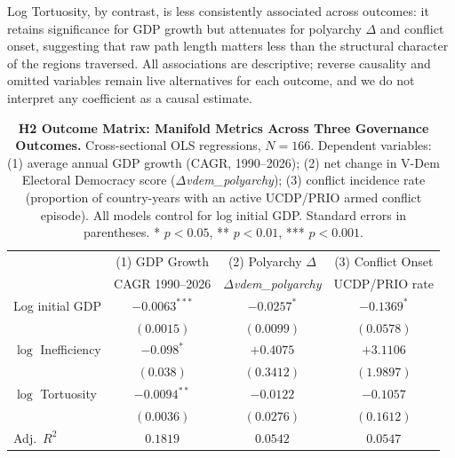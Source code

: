 \documentclass[12pt]{article}
\begin{document}
Log Tortuosity, by contrast, is less consistently associated across outcomes: it retains significance for GDP growth but attenuates for polyarchy $\Delta$ and conflict onset, suggesting that raw path length matters less than the structural character of the regions traversed. All associations are descriptive; reverse causality and omitted variables remain live alternatives for each outcome, and we do not interpret any coefficient as a causal estimate.

\begin{table}[htbp]
    \centering
    \caption{\textbf{H2 Outcome Matrix: Manifold Metrics Across Three Governance Outcomes.} Cross-sectional OLS regressions, $N = 166$. Dependent variables: (1) average annual GDP growth (CAGR, 1990--2026); (2) net change in V-Dem Electoral Democracy score ($\Delta$\textit{vdem\_polyarchy}); (3) conflict incidence rate (proportion of country-years with an active UCDP/PRIO armed conflict episode). All models control for log initial GDP. Standard errors in parentheses. * $p < 0.05$, ** $p < 0.01$, *** $p < 0.001$.}
    \label{tab:outcome_matrix}
    \begin{tabular}{lccc}
        \toprule
                            & (1) GDP Growth  & (2) Polyarchy $\Delta$           & (3) Conflict Onset                    \\
                            & CAGR 1990--2026 & $\Delta$\textit{vdem\_polyarchy} & UCDP/PRIO rate                        \\
        \midrule
        Log initial GDP     & $-0.0063^{***}$ & $-0.0257^{*}$                    & $-0.1369^{*}$                         \\
                            & $(0.0015)$      & $(0.0099)$                       & $(0.0578)$                            \\[4pt]
        $\log$ Inefficiency & $-0.098^{*}$    & $+0.4075$                        & $+3.1106$                             \\
                            & $(0.038)$       & $(0.3412)$                       & $(1.9897)$                            \\[4pt]
        $\log$ Tortuosity   & $-0.0094^{**}$  & $-0.0122$                        & $-0.1057$                             \\
                            & $(0.0036)$      & $(0.0276)$                       & $(0.1612)$                            \\
        \midrule
        Adj.\ $R^{2}$       & $0.1819$        & $0.0542$                         & $0.0547$                              \\

\end{tabular}
\end{table}
\end{document}
